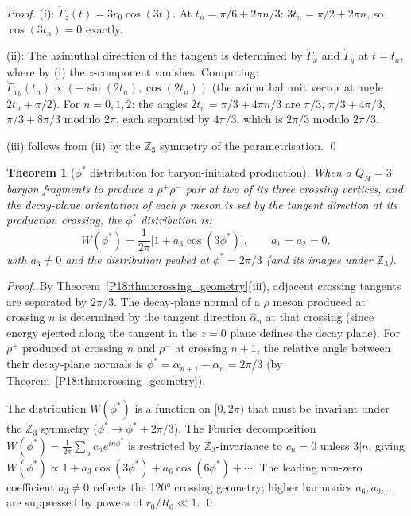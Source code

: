 \documentclass[11pt,a4paper]{article}
\newtheorem{theorem}{Theorem}[section]
\theoremstyle{definition}\newtheorem{definition}[theorem]{Definition}
\theoremstyle{remark}
\newcommand{\QH}{Q_H}
\newcommand{\Zthree}{\mathbb{Z}_3}
\newcommand{\phistar}{\phi^*}
\begin{document}
\begin{proof}
(i): $\dot\Gamma_z(t)=3r_0\cos(3t)$.  At $t_n=\pi/6+2\pi n/3$:
$3t_n=\pi/2+2\pi n$, so $\cos(3t_n)=0$ exactly.

(ii): The azimuthal direction of the tangent is determined by
$\dot\Gamma_x$ and $\dot\Gamma_y$ at $t=t_n$, where by (i) the
$z$-component vanishes.  Computing:
$\dot\Gamma_{xy}(t_n)\propto(-\sin(2t_n),\cos(2t_n))$
(the azimuthal unit vector at angle $2t_n+\pi/2$).
For $n=0,1,2$: the angles $2t_n=\pi/3+4\pi n/3$ are
$\pi/3$, $\pi/3+4\pi/3$, $\pi/3+8\pi/3$ modulo $2\pi$,
each separated by $4\pi/3$, which is $2\pi/3$ modulo $2\pi/3$.

(iii) follows from (ii) by the $\Zthree$ symmetry of the parametrisation.
\qed
\end{proof}

\begin{theorem}[$\phistar$ distribution for baryon-initiated production]
\label{P18:thm:phi_star}
When a $\QH=3$ baryon fragments to produce a $\rho^+\rho^-$ pair
at two of its three crossing vertices, and the decay-plane
orientation of each $\rho$ meson is set by the tangent direction at
its production crossing, the $\phistar$ distribution is:
\begin{equation}
  W(\phistar) = \frac{1}{2\pi}\bigl[1 + a_3\cos(3\phistar)\bigr],
  \qquad a_1=a_2=0,
  \label{P18:eq:phi_star_dist}
\end{equation}
with $a_3\neq0$ and the distribution peaked at $\phistar=2\pi/3$
(and its images under $\Zthree$).
\end{theorem}

\begin{proof}
By Theorem~\ref{P18:thm:crossing_geometry}(iii), adjacent crossing
tangents are separated by $2\pi/3$.  The decay-plane normal of a
$\rho$ meson produced at crossing $n$ is determined by the tangent
direction $\hat\alpha_n$ at that crossing (since energy ejected
along the tangent in the $z=0$ plane defines the decay plane).  For
$\rho^+$ produced at crossing $n$ and $\rho^-$ at crossing $n+1$,
the relative angle between their decay-plane normals is
$\phistar=\alpha_{n+1}-\alpha_n=2\pi/3$ (by
Theorem~\ref{P18:thm:crossing_geometry}).

The distribution $W(\phistar)$ is a function on $[0,2\pi)$ that
must be invariant under the $\Zthree$ symmetry ($\phistar\to
\phistar+2\pi/3$).  The Fourier decomposition
$W(\phistar)=\frac{1}{2\pi}\sum_n c_n e^{in\phistar}$ is restricted
by $\Zthree$-invariance to $c_n=0$ unless $3|n$, giving
$W(\phistar)\propto 1+a_3\cos(3\phistar)+a_6\cos(6\phistar)+\cdots$.
The leading non-zero coefficient $a_3\neq0$ reflects the 120°
crossing geometry; higher harmonics $a_6,a_9,\ldots$ are
suppressed by powers of $r_0/R_0\ll1$.
\qed
\end{proof}
\end{document}
